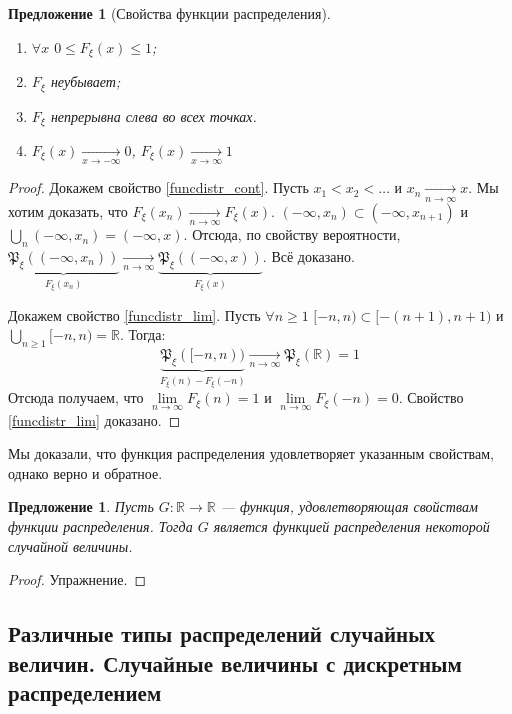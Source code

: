 \documentclass[11pt,openany,a4paper]{scrartcl}
\theoremstyle{plain}
\newtheorem{proposition}[theorem]{Предложение}
\theoremstyle{definition}
\newcommand\mb{\mathbb}
\newcommand\real{\mb R}
\newcommand{\underto}[1]{\xrightarrow[#1]{}}
\newcommand{\distr}{\mathfrak P_\xi}
\newcommand{\funcdistr}{F_\xi}
\begin{document}
\begin{proposition}[Свойства функции распределения]
    \begin{enumerate}
        \item $\forall x$ $0\leqslant \funcdistr(x) \leqslant 1$;
        \item $\funcdistr$ неубывает;
        \item\label{funcdistr_cont} $\funcdistr$ непрерывна слева во всех точках.
        \item\label{funcdistr_lim} $\funcdistr(x) \underto{x \to -\infty} 0$,
        $\funcdistr(x) \underto{x \to \infty} 1$
    \end{enumerate}
\end{proposition}
\begin{proof}
    Докажем свойство \ref{funcdistr_cont}.
    Пусть $x_1 < x_2 < \ldots$ и $x_n \underto{n \to \infty} x$.
    Мы хотим доказать, что $\funcdistr(x_n) \underto{n \to \infty} \funcdistr(x)$.
    $(-\infty, x_n) \subset (-\infty, x_{n+1})$ и $\bigcup\limits_n(-\infty, x_n)
    = (-\infty, x)$. Отсюда, по свойству вероятности,
    $\underbrace{\distr((-\infty, x_n))}_{\funcdistr(x_n)}
    \underto{n \to \infty} \underbrace{\distr((-\infty, x))}_{\funcdistr(x)}$.
    Всё доказано.
    
    Докажем свойство \ref{funcdistr_lim}.
    Пусть $\forall n \geqslant 1$ $[-n, n) \subset [-(n+1), n+1)$ и
    $\bigcup\limits_{n \geqslant 1}[-n, n) = \real$. Тогда:
    $$
    \underbrace{\distr([-n, n))}_{\funcdistr(n) - \funcdistr(-n)}
    \underto{n \to \infty} \distr(\real) = 1
    $$
    Отсюда получаем, что $\lim\limits_{n \to \infty} \funcdistr(n) = 1$
    и $\lim\limits_{n \to \infty} \funcdistr(-n) = 0$. Свойство \ref{funcdistr_lim}
    доказано.
\end{proof}

Мы доказали, что функция распределения удовлетворяет указанным свойствам, однако
верно и обратное.

\begin{proposition}
    Пусть $G: \real \to \real$ — функция, удовлетворяющая свойствам функции
    распределения. Тогда $G$ является функцией распределения некоторой случайной 
    величины.
\end{proposition}
\begin{proof}
    Упражнение.
\end{proof}

\subsection{Различные типы распределений случайных величин. Случайные величины
с дискретным распределением}
\end{document}
